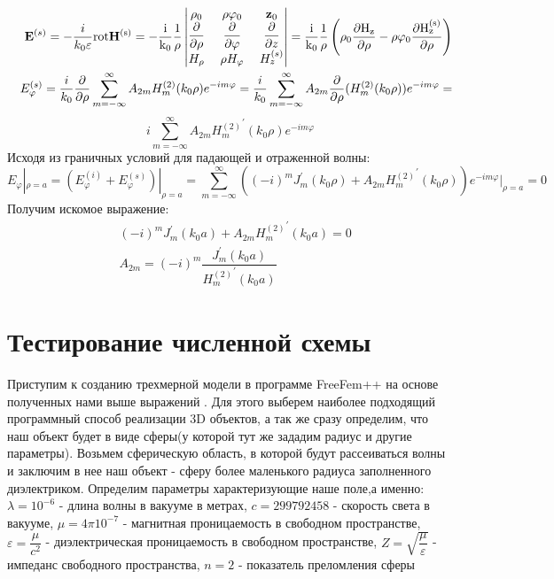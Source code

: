 \begin{eqnarray}
&&\vec{E}^{(s)} = - \dfrac{i}{k_{0}\varepsilon} \rm rot\vec{H}^{(s)} = - \dfrac{i}{k_{0}} \dfrac{1}{\rho}
\begin{vmatrix}
\vec{\rho}_{0}& \;\rho \vec{\varphi}_{0}& \; \vec{z}_{0} \\
\dfrac{\partial }{\partial \rho}& \; 
\dfrac{\partial }{\partial \varphi}&\; 
\dfrac{\partial }{\partial z} \\
H_{\rho}&\; \rho H_{\varphi}&\; H_{z}^{(s)}
\end{vmatrix}
= \dfrac{i}{k_{0}} \dfrac{1}{\rho}\left(\vec{\rho}_{0}
\dfrac{\partial H_{z}}{\partial \rho} - \rho\vec{\varphi}_{0}
\dfrac{\partial H_{z}^{(s)}}{\partial \rho}\right)
\\
&&E_{\varphi}^{(s)} = \dfrac{i}{k_{0}}
\dfrac{\partial }{\partial \rho} \sum_{m=-\infty}^{\infty} A_{2m}H_{m}^{(2)}(k_{0}\rho)e^{-im\varphi} =
\dfrac{i}{k_{0}} \sum_{m=-\infty}^{\infty}A_{2m} 
\dfrac{\partial }{\partial \rho}
(H_{m}^{(2)}(k_{0}\rho))e^{-im\varphi}
=
\end{eqnarray}
\begin{equation}
i\sum_{m=-\infty}^{\infty}A_{2m}{H_{m}^{(2)}}^{\prime}(k_{0}\rho)e^{-im\varphi}
\end{equation}
Исходя из граничных условий для падающей и отраженной волны:
\begin{equation}
E_{\varphi}|_{\rho=a} = (E_{\varphi}^{(i)} + E_{\varphi}^{(s)})|_{\rho=a} = \sum_{m=-\infty}^{\infty}
((-i)^{m}J_{m}^{\prime}(k_{0}\rho) + A_{2m}{H_{m}^{(2)}}^{\prime}(k_{0}\rho))e^{-im\varphi}|_{\rho=a} = 0
\end{equation}
Получим искомое выражение:
\begin{align}
&(-i)^{m}J_{m}^{\prime}(k_{0}a) + A_{2m}{H_{m}^{(2)}}^{\prime}(k_{0}a) = 0\\
&A_{2m} = (-i)^{m} \dfrac{J_{m}^{\prime}(k_{0}a)}
{{H_{m}^{(2)}}^{\prime}(k_{0}a)}
\end{align}
\section{Тестирование численной схемы}

Приступим к созданию трехмерной модели в программе FreeFem++ на основе полученных нами выше выражений \cite{bfreefem}.  Для этого выберем наиболее подходящий программный способ реализации 3D объектов, а так же сразу определим, что наш объект будет в виде сферы(у которой тут же зададим радиус и другие параметры). Возьмем сферическую область, в которой будут рассеиваться волны и заключим в нее наш объект - сферу более маленького радиуса заполненного диэлектриком.
Определим параметры характеризующие наше поле,а именно:
	$ \lambda = 10^{-6} $ - длина волны в вакууме в метрах,
	$ c = 299792458 $ - скорость света в вакууме, $ \mu = 4\pi 10^{-7} $ - магнитная проницаемость в свободном пространстве, $ \varepsilon = \dfrac{\mu}{c^{2}} $ - диэлектрическая проницаемость в свободном пространстве, $ Z = \sqrt{\dfrac{\mu}{\varepsilon}} $ - импеданс свободного пространства, $ n = 2 $ - показатель преломления сферы

